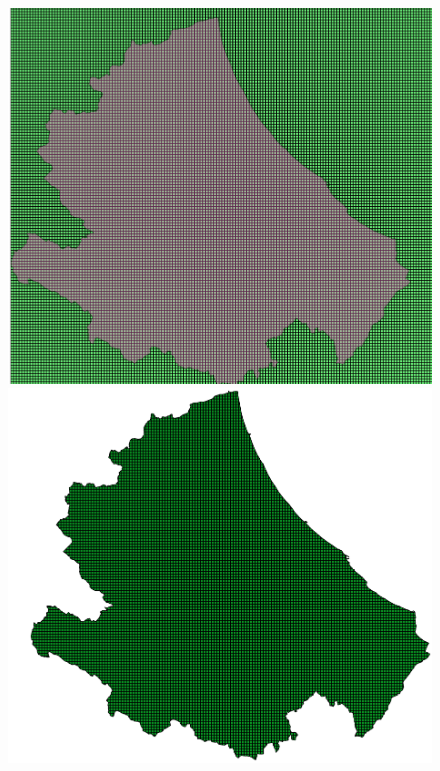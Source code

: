 \begin{figure}[h]
	\hspace{0.1\linewidth}
	\begin{minipage}[t]{0.30\linewidth}
		\centering
		\includegraphics[width=\textwidth]{images/abruzzoQuadratini.PNG}
		\caption{}
		\label{fig:griglia}
	\end{minipage}
	\hspace{0.2\linewidth}
	\begin{minipage}[t]{0.30\linewidth}
		\centering
		\includegraphics[width=\textwidth]{images/abruzzo.PNG}
		\caption{}
		\label{fig:abruzzoGriglia}
	\end{minipage}
\end{figure}
